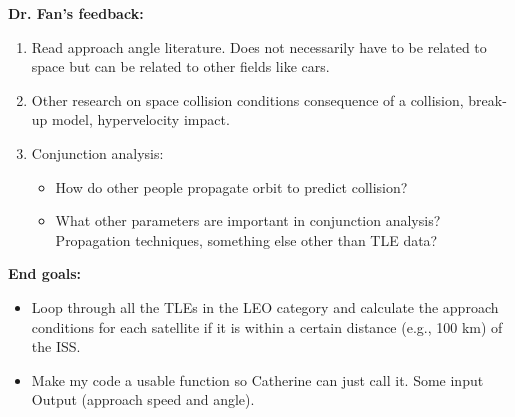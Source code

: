 \documentclass[12pt]{report}
\begin{document}
\noindent \textbf{Dr. Fan's feedback:}
  \begin{enumerate}
    \item Read approach angle literature. Does not necessarily have to be related to space but can be related to other fields like cars.
    \item Other research on space collision conditions consequence of a collision, break-up model, hypervelocity impact.
    \item Conjunction analysis: 
          \begin{itemize}
            \item How do other people propagate orbit to predict collision?
            \item What other parameters are important in conjunction analysis? Propagation techniques, something else other than TLE data?
          \end{itemize}
  \end{enumerate}

\noindent \textbf{End goals:}
\begin{itemize}
  \item Loop through all the TLEs in the LEO category and calculate the approach conditions for each satellite if it is within a certain distance (e.g., 100 km) of the ISS.
  \item Make my code a usable function so Catherine can just call it. Some input \textrightarrow{} Output (approach speed and angle).
\end{itemize}
\end{document}
